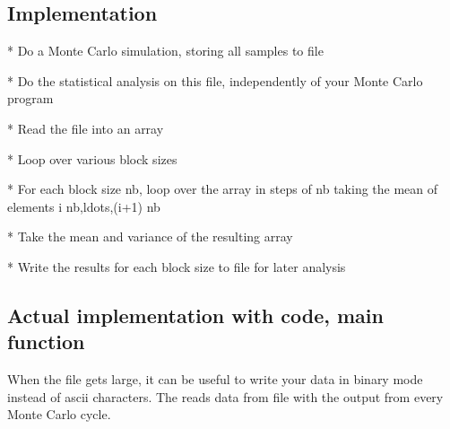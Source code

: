 \documentclass[letterpaper,10pt,english]{sphinxmanual}
\begin{document}
\subsection{Implementation}
\label{\detokenize{chapter2:implementation}}
\begin{sphinxVerbatim}[commandchars=\\\{\}]
* Do a Monte Carlo simulation, storing all samples to file

* Do the statistical analysis on this file, independently of your Monte Carlo program

* Read the file into an array

* Loop over various block sizes

* For each block size \PYGZdl{}n\PYGZus{}b\PYGZdl{}, loop over the array in steps of \PYGZdl{}n\PYGZus{}b\PYGZdl{} taking the mean of elements \PYGZdl{}i n\PYGZus{}b,\PYGZbs{}ldots,(i+1) n\PYGZus{}b\PYGZdl{}

* Take the mean and variance of the resulting array

* Write the results for each block size to file for later
  analysis
\end{sphinxVerbatim}


\subsection{Actual implementation with code, main function}
\label{\detokenize{chapter2:actual-implementation-with-code-main-function}}
When the file gets large, it can be useful to write your data in binary mode instead of ascii characters.
The    reads data from file with the output from every Monte Carlo cycle.
\end{document}
